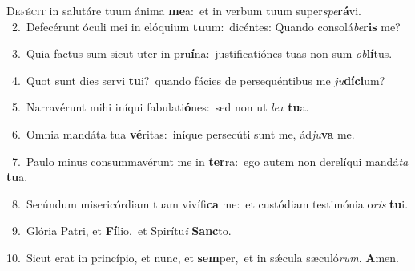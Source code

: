 \lettrine{\initial\textcolor{\initialcolor}{D}}{efécit} in salutáre tuum ánima \textbf{me}\-a:~\star et in verbum tuum super\-\textit{spe}\-\textbf{rá}vi.\\
{\numbfont\textcolor{\numbcolor}{~2.}}~Defecérunt óculi mei in elóquium \textbf{tu}\-um:~\star dicéntes: Quando consolá\-\textit{be}\-\textbf{ris} me?\par
{\numbfont\textcolor{\numbcolor}{~3.}}~Quia factus sum sicut uter in pru\-\textbf{í}\-na:~\star justificatiónes tuas non sum \textit{ob}\-\textbf{lí}tus.\par
{\numbfont\textcolor{\numbcolor}{~4.}}~Quot sunt dies servi \textbf{tu}\-i?~\star quando fácies de persequéntibus me \textit{ju}\-\textbf{dí}\textbf{ci}um?\par
{\numbfont\textcolor{\numbcolor}{~5.}}~Narravérunt mihi iníqui fabulati\-\textbf{ó}\-nes:~\star sed non ut \textit{lex} \textbf{tu}\-a.\par
{\numbfont\textcolor{\numbcolor}{~6.}}~Omnia mandáta tua \textbf{vé}\-ritas:~\star iníque persecúti sunt me, ád\-\textit{ju}\-\textbf{va} me.\par
{\numbfont\textcolor{\numbcolor}{~7.}}~Paulo minus consummavérunt me in \textbf{ter}\-ra:~\star ego autem non derelíqui mandá\textit{ta} \textbf{tu}\-a.\par
{\numbfont\textcolor{\numbcolor}{~8.}}~Secúndum misericórdiam tuam vivífi\textbf{ca} me:~\star et custódiam testimónia o\textit{ris} \textbf{tu}\-i.\par
{\numbfont\textcolor{\numbcolor}{~9.}}~Glória Patri, et \textbf{Fí}\-lio,~\star et Spirítu\textit{i} \textbf{Sanc}\-to.\par
{\numbfont\textcolor{\numbcolor}{10.}}~Sicut erat in princípio, et nunc, et \textbf{sem}\-per,~\star et in sǽcula sæculó\-\textit{rum}\-. \textbf{A}\-men.\par
